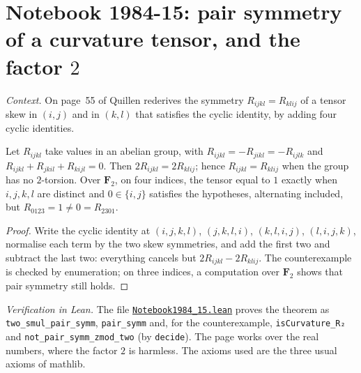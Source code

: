 \section[Notebook 1984-15: pair symmetry of a curvature tensor]{Notebook 1984-15: pair symmetry of a curvature tensor, and the factor $2$\protect{}}\label{sec:quillen-1984-15}

\emph{Context.} On page~55 of  Quillen rederives the symmetry $R_{ijkl} = R_{klij}$ of a tensor skew in $(i, j)$ and in $(k, l)$ that satisfies the cyclic identity, by adding four cyclic identities.

\begin{encadre}
\begin{theoreme}\label{thm:quillen-1984-15}
Let $R_{ijkl}$ take values in an abelian group, with $R_{ijkl} = -R_{jikl} = -R_{ijlk}$ and $R_{ijkl} + R_{jkil} + R_{kijl} = 0$. Then $2R_{ijkl} = 2R_{klij}$; hence $R_{ijkl} = R_{klij}$ when the group has no $2$-torsion. Over $\mathbf F_2$, on four indices, the tensor equal to $1$ exactly when $i, j, k, l$ are distinct and $0 \in \{i, j\}$ satisfies the hypotheses, alternating included, but $R_{0123} = 1 \neq 0 = R_{2301}$.
\end{theoreme}
\end{encadre}

\begin{proof}
Write the cyclic identity at $(i, j, k, l)$, $(j, k, l, i)$, $(k, l, i, j)$, $(l, i, j, k)$, normalise each term by the two skew symmetries, and add the first two and subtract the last two: everything cancels but $2R_{ijkl} - 2R_{klij}$. The counterexample is checked by enumeration; on three indices, a computation over $\mathbf F_2$ shows that pair symmetry still holds.
\end{proof}

\emph{Verification in Lean.} The file \href{\leanblobmain/Notebook1984_15.lean}{\texttt{Notebook1984\_15.\allowbreak{}lean}} proves the theorem as \texttt{two\_smul\_pair\_symm}, \texttt{pair\_symm} and, for the counterexample, \texttt{isCurvature\_R₂} and \texttt{not\_pair\_symm\_zmod\_two} (by \texttt{decide}). The page works over the real numbers, where the factor $2$ is harmless. The axioms used are the three usual axioms of mathlib.

